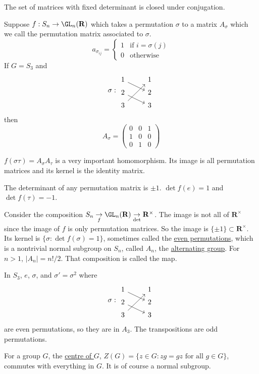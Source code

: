 \documentclass[11pt, oneside]{amsart}
\numberwithin{equation}{section}
\numberwithin{theorem}{section}
\theoremstyle{definition}
\def\R{\mathbf{R}}
\begin{document}
The set of matrices with fixed determinant is closed under conjugation.


Suppose $f : S_n \to\GL_n(\R)$ which takes a permutation $\sigma$ to a matrix $A_\sigma$ which we call the permutation matrix associated to $\sigma$.
$$
a_{\sigma_{ij}}  = \begin{cases}
      1 & \text{if }i=\sigma(j) \\
      0 & \text{otherwise}
    \end{cases}
$$
If $G=S_3$ and 
$$
 \sigma :  
\begin{tikzcd}[row sep=tiny]
1 \arrow[rd]  & 1 \\ 2 \arrow[rd]& 2 \\ 3 \arrow[ruu]& 3
\end{tikzcd}
$$
then 
$$
A_\sigma = \left(\begin{array}{ccc}{0}&{0}&{1}\\{1}&{0}&{0}\\{0}&{1}&{0}\end{array}\right)
$$


$f(\sigma\tau) = A_\sigma A_\tau$ is a very important homomorphism. Its image is all permutation matrices and its kernel is the identity matrix.


The determinant of any permutation matrix is $\pm 1$. $\det f(e) = 1$ and $\det f(\tau)=-1$.


Consider the composition $S_n \underset{f}{\to} \GL_n(\R) \underset{\det}{\to} \R^\times$. The image is not all of $\R^\times$ since the image of $f$ is only permutation matrices. So the image is $\{\pm 1\}\subset \R^\times$. Its kernel is $\{\sigma : \det f(\sigma) = 1\}$, sometimes called the \underline{even permutations}, which is a nontrivial normal subgroup on $S_n$, called $A_n$, the \underline{alternating group}. For $n>1$, $|A_n| = {n!}/{2}$. That composition is called the 
 map. 


In $S_3$, $e$, $\sigma$, and $ \sigma'=\sigma^2$ where
$$
\sigma : \begin{tikzcd}[row sep=tiny]
1 \arrow[rd]  & 1 \\ 2 \arrow[rd]& 2 \\ 3 \arrow[ruu]& 3
\end{tikzcd}
$$
are even permutations, so they are in $A_3$. The transpositions are odd permutations.


For a group $G$, the \underline{centre of $G$}, $Z(G) = \{ z\in G : zg = gz \textrm{ for all }g\in G \}$, commutes with everything in $G$. It is of course a normal subgroup. 
\end{document}
